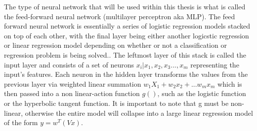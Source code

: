 The type of neural network that will be used within this thesis is
what is called the feed-forward neural network (multilayer perceptron
aka MLP). The feed forward neural network is essentially a series of
logistic regression models stacked on top of each other, with the
final layer being either another logicstic regression or linear
regression model depending on whether or not a classification or
regression problem is being solved.\cite{Murphy}. The leftmost
layer of this stack is called the input layer and consists of a set of
neurons ${x_i|x_1,x_2,x_3...,x_m}$ representing the input's
features. Each neuron in the hidden layer transforms the values from
the previous layer via weighted linear summation $w_1X_1 + w_2x_2 +...w_mx_m$
which is then passed into a non linear-action function $g()$, such as the logistic
function or the hyperbolic tangent function. It is important to note that g must be non-linear,
otherwise the entire model will collapse into a large linear regression model of
the form $y = w^T(Vx)$. \cite{Murphy}

